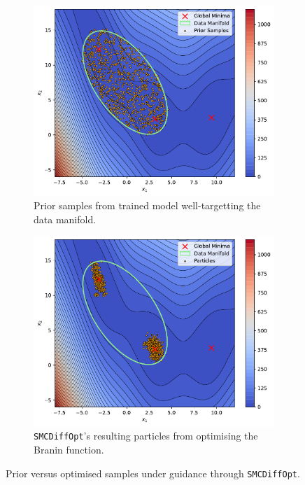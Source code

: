 \begin{figure}[t]
    \centering
    \begin{subfigure}[b]{0.48\textwidth}
        \centering
        \includegraphics[width=1\textwidth]{assets/smc_branin_prior.pdf}
        \caption{Prior samples from trained model well-targetting the data manifold.}
        \label{fig:branin-prior}
    \end{subfigure}
    \hfill
    \begin{subfigure}[b]{0.48\textwidth}
        \centering
        \includegraphics[width=1\textwidth]{assets/smc_branin.pdf}
        \caption{\texttt{SMCDiffOpt}'s resulting particles from optimising the Branin function.}
        \label{fig:branin-smc}
    \end{subfigure}
    \caption{Prior versus optimised samples under guidance through \texttt{SMCDiffOpt}.}
    \label{fig:branin-prior-smc}
\end{figure}

